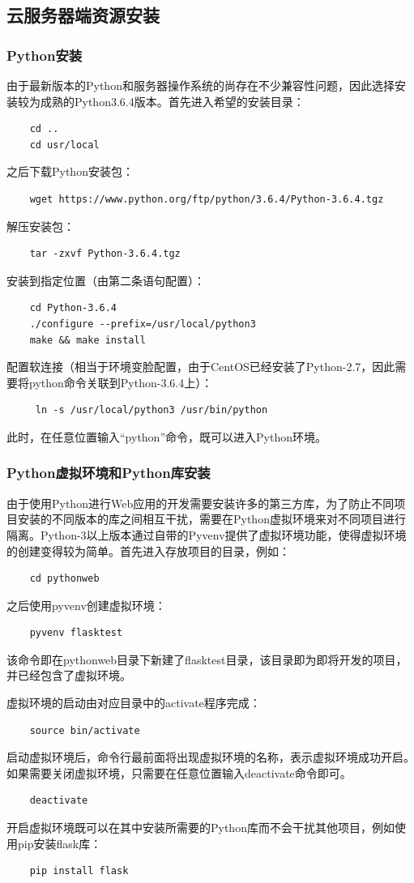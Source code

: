 \documentclass[a4paper,11pt]{ctexart}
\begin{document}
\begin{spacing}{1.5}
\subsection{云服务器端资源安装}
\subsubsection{Python安装}
\par
由于最新版本的Python和服务器操作系统的尚存在不少兼容性问题，因此选择安装较为成熟的Python3.6.4版本。首先进入希望的安装目录：
\begin{verbatim}
    cd ..
    cd usr/local
\end{verbatim}
之后下载Python安装包：
\begin{verbatim}
    wget https://www.python.org/ftp/python/3.6.4/Python-3.6.4.tgz
\end{verbatim}
解压安装包：
\begin{verbatim}
    tar -zxvf Python-3.6.4.tgz
\end{verbatim}
安装到指定位置（由第二条语句配置）：
\begin{verbatim}
    cd Python-3.6.4
    ./configure --prefix=/usr/local/python3
    make && make install
\end{verbatim}
配置软连接（相当于环境变脸配置，由于CentOS已经安装了Python-2.7，因此需要将python命令关联到Python-3.6.4上）：
\begin{verbatim}
     ln -s /usr/local/python3 /usr/bin/python
\end{verbatim}
此时，在任意位置输入“python”命令，既可以进入Python环境。
\subsubsection{Python虚拟环境和Python库安装}
\par
由于使用Python进行Web应用的开发需要安装许多的第三方库，为了防止不同项目安装的不同版本的库之间相互干扰，需要在Python虚拟环境来对不同项目进行隔离。Python-3以上版本通过自带的Pyvenv提供了虚拟环境功能，使得虚拟环境的创建变得较为简单。首先进入存放项目的目录，例如：
\begin{verbatim}
    cd pythonweb
\end{verbatim}
之后使用pyvenv创建虚拟环境：
\begin{verbatim}
    pyvenv flasktest
\end{verbatim}
该命令即在pythonweb目录下新建了flasktest目录，该目录即为即将开发的项目，并已经包含了虚拟环境。
\par
虚拟环境的启动由对应目录中的activate程序完成：
\begin{verbatim}
    source bin/activate
\end{verbatim}
启动虚拟环境后，命令行最前面将出现虚拟环境的名称，表示虚拟环境成功开启。如果需要关闭虚拟环境，只需要在任意位置输入deactivate命令即可。
\begin{verbatim}
    deactivate
\end{verbatim}
\par
开启虚拟环境既可以在其中安装所需要的Python库而不会干扰其他项目，例如使用pip安装flask库：
\begin{verbatim}
    pip install flask
\end{verbatim}





\end{spacing}
\end{document}
